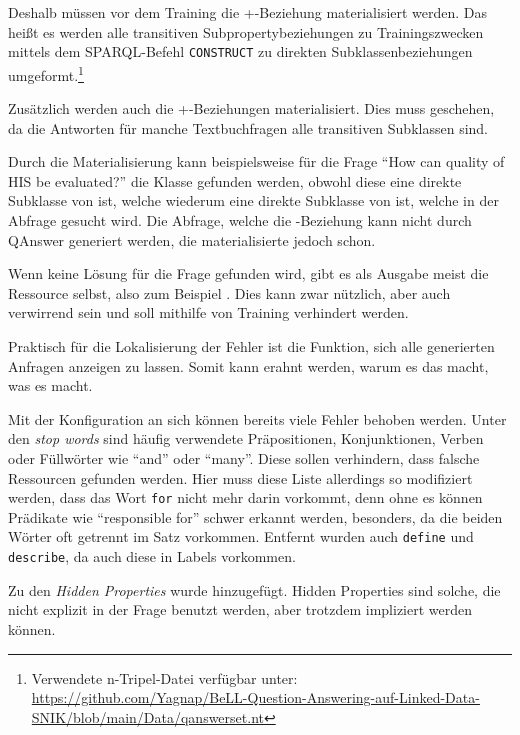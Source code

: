\documentclass[utf8,biblatex]{lni}
\begin{document}
Deshalb müssen vor dem Training die +-Beziehung materialisiert werden.
Das heißt es werden alle transitiven Subpropertybeziehungen zu Trainingszwecken mittels dem SPARQL-Befehl \texttt{CONSTRUCT} zu direkten Subklassenbeziehungen umgeformt.\footnote{Verwendete n-Tripel-Datei verfügbar unter:\\\url{https://github.com/Yagnap/BeLL-Question-Answering-auf-Linked-Data-SNIK/blob/main/Data/qanswerset.nt}}

Zusätzlich werden auch die +-Beziehungen materialisiert.
Dies muss geschehen, da die Antworten für manche Textbuchfragen alle transitiven Subklassen sind.

Durch die Materialisierung kann beispielsweise für die Frage \enquote{How can quality of HIS be evaluated?}
die Klasse  gefunden werden, obwohl diese eine direkte Subklasse von  ist,
welche wiederum eine direkte Subklasse von  ist, welche in der Abfrage gesucht wird.
Die Abfrage, welche die -Beziehung kann nicht durch QAnswer generiert werden, die materialisierte  jedoch schon.

Wenn keine Lösung für die Frage gefunden wird, gibt es als Ausgabe meist die Ressource selbst, also zum Beispiel .
Dies kann zwar nützlich, aber auch verwirrend sein und soll mithilfe von Training verhindert werden.

Praktisch für die Lokalisierung der Fehler ist die Funktion, sich alle generierten Anfragen anzeigen zu lassen.
Somit kann erahnt werden, warum es das macht, was es macht.

Mit der Konfiguration an sich können bereits viele Fehler behoben werden.
Unter den \emph{stop words} sind häufig verwendete Präpositionen, Konjunktionen, Verben oder Füllwörter wie \enquote{and} oder \enquote{many}.
Diese sollen verhindern, dass falsche Ressourcen gefunden werden.
Hier muss diese Liste allerdings so modifiziert werden, dass das Wort \texttt{for} nicht mehr darin vorkommt, denn ohne es können Prädikate wie \enquote{responsible for} schwer erkannt werden,
besonders, da die beiden Wörter oft getrennt im Satz vorkommen.
Entfernt wurden auch \texttt{define} und \texttt{describe}, da auch diese in Labels vorkommen.

Zu den \emph{Hidden Properties} wurde  hinzugefügt.
Hidden Properties sind solche, die nicht explizit in der Frage benutzt werden, aber trotzdem impliziert werden können.
\end{document}
